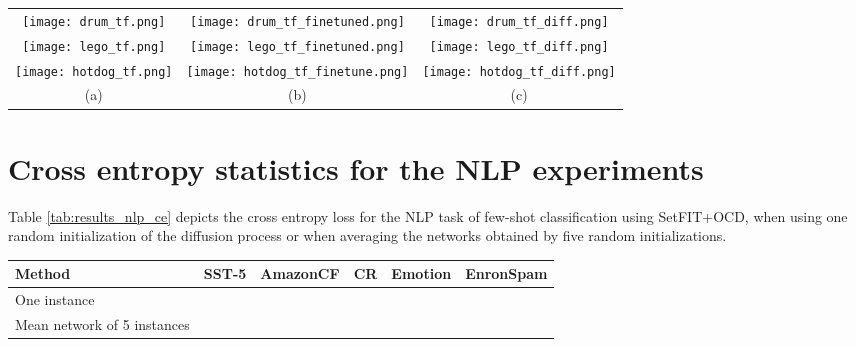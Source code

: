 \documentclass{article}
\theoremstyle{plain}
\begin{document}
\begin{figure*}[t]
  \begin{tabular}{@{}ccc@{}}
     \texttt{[image: drum\_tf.png]} & 
          \texttt{[image: drum\_tf\_finetuned.png]} &
     \texttt{[image: drum\_tf\_diff.png]}\\
     \texttt{[image: lego\_tf.png]} & 
          \texttt{[image: lego\_tf\_finetuned.png]} &
     \texttt{[image: lego\_tf\_diff.png]}\\
          \texttt{[image: hotdog\_tf.png]} & 
          \texttt{[image: hotdog\_tf\_finetune.png]} &
     \texttt{[image: hotdog\_tf\_diff.png]}\\
     (a)&      (b)&     (c)\\
  \end{tabular}
    \caption{Sample TinyNeRF results on the Drums/Lego/Hotdog model. 
    (a) Base model on a test view. (b) Same test view, overfitted using the ground truth  (c) OCD (ours).}
    \label{fig:array_sample_1}
\end{figure*}

\section{Cross entropy statistics for the NLP experiments}
\label{app:results_nlp_ce}
Table \ref{tab:results_nlp_ce} depicts the cross entropy loss for the NLP task of few-shot classification using SetFIT+OCD, when using one random initialization of the diffusion process or when averaging the networks obtained by five random initializations.

\begin{table*}[t]
    \centering
    \begin{tabular}{lccccc} 
         \toprule
          Method & \multicolumn{1}{c}{SST-5} & \multicolumn{1}{c}{AmazonCF}&\multicolumn{1}{c}{CR}&\multicolumn{1}{c}{Emotion}&\multicolumn{1}{c}{EnronSpam}\\
            \midrule
        One instance &&&&&\\
        Mean network of 5 instances & &&&&\\
         \bottomrule
        \end{tabular}
    \caption{The Cross-Entropy loss for the NLP task of few-shot classification with 8 samples per class using SetFIT + OCD, comparing one instance to the mean network obtained with 5 instances.}
    \label{tab:results_nlp_ce}
\end{table*}
\end{document}
